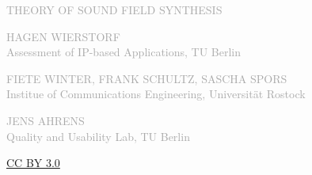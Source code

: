 \begin{titlepage}
    \sffamily%
    \begin{fullwidth}%
        \fontsize{36}{40}\selectfont\par\noindent\textcolor{darkgray}{\centering%
        \uppercase{Theory of Sound Field Synthesis\\}
        }%
        \vspace{1.6cm}%
        \fontsize{18}{20}\selectfont\par\noindent\textcolor{darkgray}{\centering%
        \MakeTextUppercase{Hagen Wierstorf}\\
        Assessment of IP-based Applications, TU Berlin\\
        }%
        \vspace{1cm}%
        \fontsize{18}{20}\selectfont\par\noindent\textcolor{darkgray}{\centering%
        \MakeTextUppercase{Fiete Winter, Frank Schultz, Sascha Spors}\\
        Institue of Communications Engineering, Universit\"at Rostock\\
        }%
        \vspace{1cm}%
        \fontsize{18}{20}\selectfont\par\noindent\textcolor{darkgray}{\centering%
        \MakeTextUppercase{Jens Ahrens}\\
        Quality and Usability Lab, TU Berlin\\
        }%
        \vfill
        \fontsize{18}{20}\selectfont\par\noindent\textcolor{darkgray}{\centering%
        \href{https://creativecommons.org/licenses/by/3.0/}{%
        CC BY 3.0}\\
        }%
    \end{fullwidth}%
\end{titlepage}
